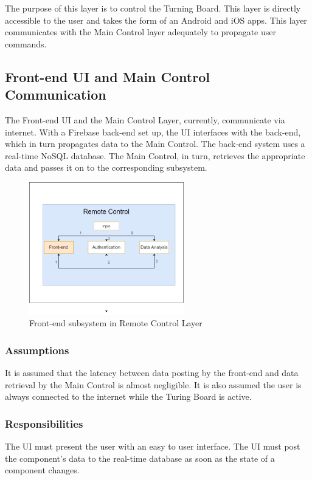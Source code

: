 The purpose of this layer is to control the Turning Board. This layer is directly accessible to the user and takes the form of an Android and iOS apps. This layer communicates with the Main Control layer adequately to propagate user commands.

\subsection{Front-end UI and Main Control Communication }
The Front-end UI and the Main Control Layer, currently, communicate via internet. With a Firebase back-end set up, the UI interfaces with the back-end, which in turn propagates data to the Main Control. The back-end system uses a real-time NoSQL database. The Main Control, in turn, retrieves the appropriate data and passes it on to the corresponding subsystem.

\begin{figure}[h!]
	\centering
 	\includegraphics[width=0.60\textwidth]{ADS Latex/images/UIJetsonCom.png}
 \caption{Front-end subsystem in Remote Control Layer}
\end{figure}

\subsubsection{Assumptions}
It is assumed that the latency between data posting by the front-end and data retrieval by the Main Control is almost negligible. It is also assumed the user is always connected to the internet while the Turing Board is active.

\subsubsection{Responsibilities}
The UI must present the user with an easy to user interface. The UI must post the component's data to the real-time database as soon as the state of a component changes.

